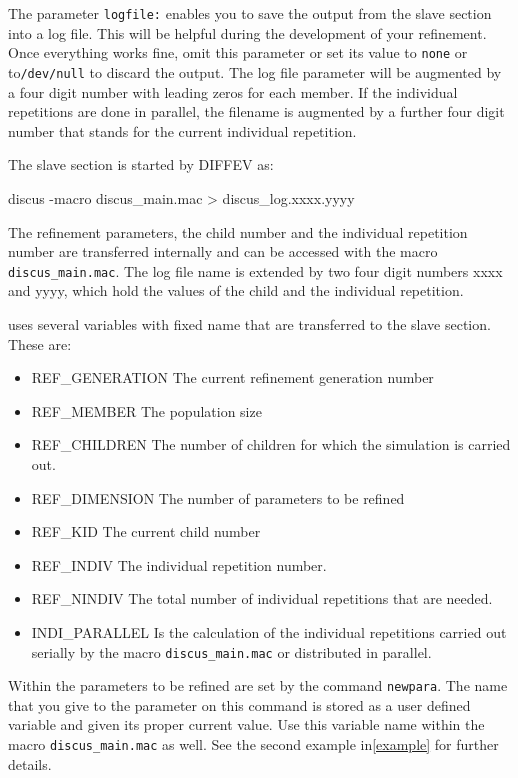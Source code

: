 The parameter {\tt logfile:} enables you to save the output from the slave 
section into a log file. This will be helpful during the development of your
refinement. Once everything works fine, omit this parameter or set its 
value to {\tt none} or to{\tt /dev/null} to discard the output. The
log file parameter will be augmented by a four digit number with leading zeros 
for each member. If the individual repetitions are done in parallel, the 
filename is augmented by a further four digit number that stands for the 
current individual repetition.


The slave section is started by DIFFEV as:
\begin{MacVerbatim}
discus -macro discus_main.mac > discus_log.xxxx.yyyy
\end{MacVerbatim}

The refinement parameters, the child number and the individual repetition
number are transferred internally and can be accessed with the macro
{\tt discus\_main.mac}. 
The log file
name is extended by two four digit numbers xxxx and yyyy, which hold the 
values of the child and the individual repetition.

\Diffev uses several variables with fixed name that are transferred to the 
slave section. These are:
\begin{itemize}
  \item REF\_GENERATION  The current refinement generation number
  \item REF\_MEMBER  The population size
  \item REF\_CHILDREN The number of children for which the simulation is carried out.
  \item REF\_DIMENSION The number of parameters to be refined
  \item REF\_KID The current child number
  \item REF\_INDIV The individual repetition number.
  \item REF\_NINDIV The total number of individual repetitions that are needed.
  \item INDI\_PARALLEL Is the calculation of the individual repetitions carried out
              serially by the macro {\tt discus\_main.mac} or distributed in parallel.
\end{itemize}

Within \Diffev the parameters to be refined are set by the command {\tt newpara}.
The name that you give to the parameter on this command is stored as a user 
defined variable and given its proper current value. Use this variable name within
the macro {\tt discus\_main.mac} as well. See the second example in\ref{example}
for further details.

